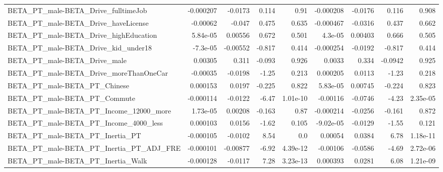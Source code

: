 \begin{tabular}{lrrrrrrrr}
BETA\_PT\_male-BETA\_Drive\_fulltimeJob                &   -0.000207 &      -0.0173 &    0.114 &     0.91 &  -0.000208 &     -0.0176 &        0.116 &         0.908 \\
BETA\_PT\_male-BETA\_Drive\_haveLicense                &    -0.00062 &       -0.047 &    0.475 &    0.635 &  -0.000467 &     -0.0316 &        0.437 &         0.662 \\
BETA\_PT\_male-BETA\_Drive\_highEducation              &    5.84e-05 &      0.00556 &    0.672 &    0.501 &    4.3e-05 &     0.00403 &        0.666 &         0.505 \\
BETA\_PT\_male-BETA\_Drive\_kid\_under18                &    -7.3e-05 &     -0.00552 &   -0.817 &    0.414 &  -0.000254 &     -0.0192 &       -0.817 &         0.414 \\
BETA\_PT\_male-BETA\_Drive\_male                       &     0.00305 &        0.311 &   -0.093 &    0.926 &     0.0033 &       0.334 &      -0.0942 &         0.925 \\
BETA\_PT\_male-BETA\_Drive\_moreThanOneCar             &    -0.00035 &      -0.0198 &    -1.25 &    0.213 &   0.000205 &      0.0113 &        -1.23 &         0.218 \\
BETA\_PT\_male-BETA\_PT\_Chinese                       &    0.000153 &       0.0197 &   -0.225 &    0.822 &   5.83e-05 &     0.00745 &       -0.224 &         0.823 \\
BETA\_PT\_male-BETA\_PT\_Commute                       &   -0.000114 &      -0.0122 &    -6.47 & 1.01e-10 &   -0.00116 &     -0.0746 &        -4.23 &      2.35e-05 \\
BETA\_PT\_male-BETA\_PT\_Income\_12000\_more             &    1.73e-05 &      0.00208 &   -0.163 &     0.87 &  -0.000214 &     -0.0256 &       -0.161 &         0.872 \\
BETA\_PT\_male-BETA\_PT\_Income\_4000\_less              &    0.000103 &       0.0156 &    -1.62 &    0.105 &  -9.02e-05 &     -0.0129 &        -1.55 &         0.121 \\
BETA\_PT\_male-BETA\_PT\_Inertia\_PT                    &   -0.000105 &      -0.0102 &     8.54 &      0.0 &    0.00054 &      0.0384 &         6.78 &      1.18e-11 \\
BETA\_PT\_male-BETA\_PT\_Inertia\_PT\_ADJ\_FRE            &   -0.000101 &     -0.00877 &    -6.92 & 4.39e-12 &   -0.00106 &     -0.0586 &        -4.69 &      2.72e-06 \\
BETA\_PT\_male-BETA\_PT\_Inertia\_Walk                  &   -0.000128 &      -0.0117 &     7.28 & 3.23e-13 &   0.000393 &      0.0281 &         6.08 &      1.21e-09 \\

\end{tabular}
